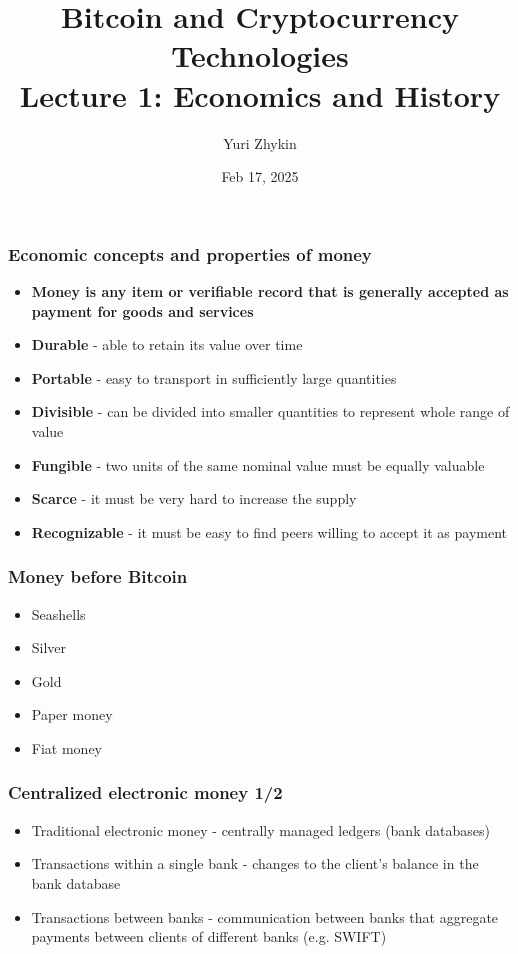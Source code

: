 \documentclass{beamer}
\title{
  Bitcoin and Cryptocurrency Technologies \\
  Lecture 1: Economics and History
}
\author{Yuri Zhykin}
\date{Feb 17, 2025}
\begin{document}
\frame{\titlepage}

\begin{frame}
  \frametitle{Economic concepts and properties of money}
  \begin{itemize}
  \item \textbf{Money is any item or verifiable record that is generally accepted as
    payment for goods and services}
  \item \textbf{Durable} - able to retain its value over time
  \item \textbf{Portable} - easy to transport in sufficiently large quantities
  \item \textbf{Divisible} - can be divided into smaller quantities to represent whole
    range of value
  \item \textbf{Fungible} - two units of the same nominal value must be equally valuable
  \item \textbf{Scarce} - it must be very hard to increase the supply
  \item \textbf{Recognizable} - it must be easy to find peers willing to accept
    it as payment
  \end{itemize}
\end{frame}

\begin{frame}
  \frametitle{Money before Bitcoin}
  \begin{itemize}
  \item Seashells
  \item Silver
  \item Gold
  \item Paper money
  \item Fiat money
  \end{itemize}
\end{frame}

\begin{frame}
  \frametitle{Centralized electronic money 1/2}
  \begin{itemize}
  \item Traditional electronic money - centrally managed ledgers (bank
    databases)
  \item Transactions within a single bank - changes to the client's balance in
    the bank database
  \item Transactions between banks - communication between banks that aggregate
    payments between clients of different banks (e.g. SWIFT)
  \end{itemize}
\end{frame}
\end{document}

